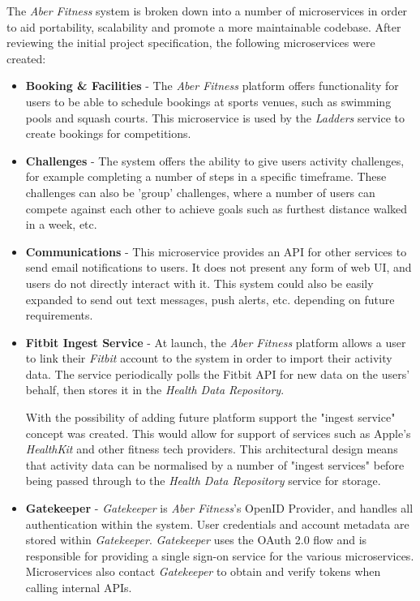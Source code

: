 The \textit{Aber Fitness} system is broken down into a number of microservices in order to aid portability, scalability and promote a more maintainable codebase. After reviewing the initial project specification, the following microservices were created:

\begin{itemize}

	\item \textbf{Booking \& Facilities} - The \textit{Aber Fitness} platform offers functionality for users to be able to schedule bookings at sports venues, such as swimming pools and squash courts. This microservice is used by the \textit{Ladders} service to create bookings for competitions.

	\item \textbf{Challenges} - The system offers the ability to give users activity challenges, for example completing a number of steps in a specific timeframe. These challenges can also be 'group' challenges, where a number of users can compete against each other to achieve goals such as furthest distance walked in a week, etc.

	\item \textbf{Communications} - This microservice provides an API for other services to send email notifications to users. It does not present any form of web UI, and users do not directly interact with it. This system could also be easily expanded to send out text messages, push alerts, etc. depending on future requirements.

	\item \textbf{Fitbit Ingest Service} - At launch, the \textit{Aber Fitness} platform allows a user to link their \textit{Fitbit} account to the system in order to import their activity data. The service periodically polls the Fitbit API for new data on the users' behalf, then stores it in the \textit{Health Data Repository}.
	
	\par With the possibility of adding future platform support the "ingest service" concept was created. This would allow for support of services such as Apple's \textit{HealthKit} and other fitness tech providers. 
	This architectural design means that activity data can be normalised by a number of "ingest services" before being passed through to the \textit{Health Data Repository} service for storage. 

	\item \textbf{Gatekeeper} - \textit{Gatekeeper} is \textit{Aber Fitness}'s OpenID Provider, and handles all authentication within the system. User credentials and account metadata are stored within \textit{Gatekeeper}. \textit{Gatekeeper} uses the OAuth 2.0 flow and is responsible for providing a single sign-on service for the various microservices. Microservices also contact \textit{Gatekeeper} to obtain and verify tokens when calling internal APIs.


\end{itemize}
